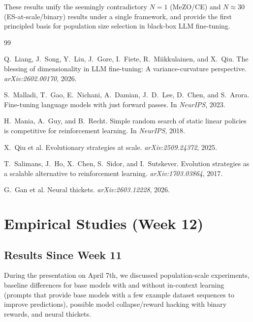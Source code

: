 \documentclass[11pt]{article}
\theoremstyle{definition}
\theoremstyle{remark}
\begin{document}
These results unify the seemingly contradictory $N=1$ (MeZO/CE) and $N \approx 30$ (ES-at-scale/binary) results under a single framework, and provide the first principled basis for population size selection in black-box LLM fine-tuning.


\begin{thebibliography}{99}

Q.~Liang, J.~Song, Y.~Liu, J.~Gore, I.~Fiete, R.~Miikkulainen, and X.~Qiu.
\newblock The blessing of dimensionality in {LLM} fine-tuning: A variance-curvature perspective.
\newblock \emph{arXiv:2602.00170}, 2026.

S.~Malladi, T.~Gao, E.~Nichani, A.~Damian, J.~D.~Lee, D.~Chen, and S.~Arora.
\newblock Fine-tuning language models with just forward passes.
\newblock In \emph{NeurIPS}, 2023.

H.~Mania, A.~Guy, and B.~Recht.
\newblock Simple random search of static linear policies is competitive for reinforcement learning.
\newblock In \emph{NeurIPS}, 2018.

X.~Qiu et al.
\newblock Evolutionary strategies at scale.
\newblock \emph{arXiv:2509.24372}, 2025.

T.~Salimans, J.~Ho, X.~Chen, S.~Sidor, and I.~Sutskever.
\newblock Evolution strategies as a scalable alternative to reinforcement learning.
\newblock \emph{arXiv:1703.03864}, 2017.

G.~Gan et al.
\newblock Neural thickets.
\newblock \emph{arXiv:2603.12228}, 2026.

\end{thebibliography}

\section{Empirical Studies (Week 12)}
\label{sec:empirical-week12}

\subsection{Results Since Week 11}

During the presentation on April 7th, we discussed population-scale experiments, baseline differences for base models with and without in-context learning (prompts that provide base models with a few example dataset sequences to improve predictions), possible model collapse/reward hacking with binary rewards, and neural thickets.
\end{document}
